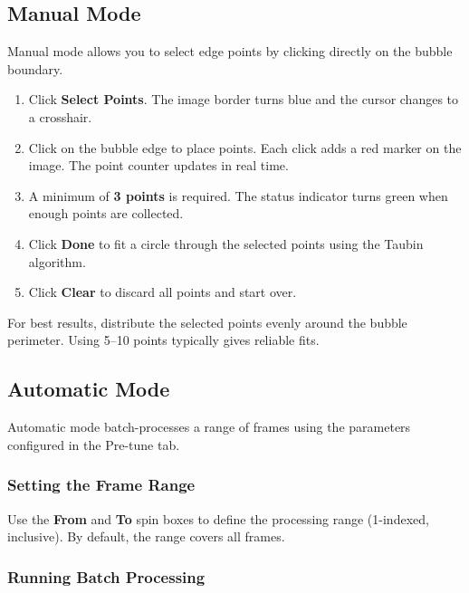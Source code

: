 \documentclass[11pt, letterpaper]{article}
\begin{document}
\subsection{Manual Mode}

Manual mode allows you to select edge points by clicking directly on the
bubble boundary.

\begin{enumerate}
    \item Click \textbf{Select Points}. The image border turns blue and the
          cursor changes to a crosshair.
    \item Click on the bubble edge to place points. Each click adds a red
          marker on the image. The point counter updates in real time.
    \item A minimum of \textbf{3 points} is required. The status indicator
          turns green when enough points are collected.
    \item Click \textbf{Done} to fit a circle through the selected points
          using the Taubin algorithm.
    \item Click \textbf{Clear} to discard all points and start over.
\end{enumerate}

\begin{tipbox}[Tip]
    For best results, distribute the selected points evenly around the
    bubble perimeter. Using 5--10 points typically gives reliable fits.
\end{tipbox}

\subsection{Automatic Mode}

Automatic mode batch-processes a range of frames using the parameters
configured in the Pre-tune tab.

\subsubsection{Setting the Frame Range}

Use the \textbf{From} and \textbf{To} spin boxes to define the processing
range (1-indexed, inclusive). By default, the range covers all frames.

\subsubsection{Running Batch Processing}
\end{document}

